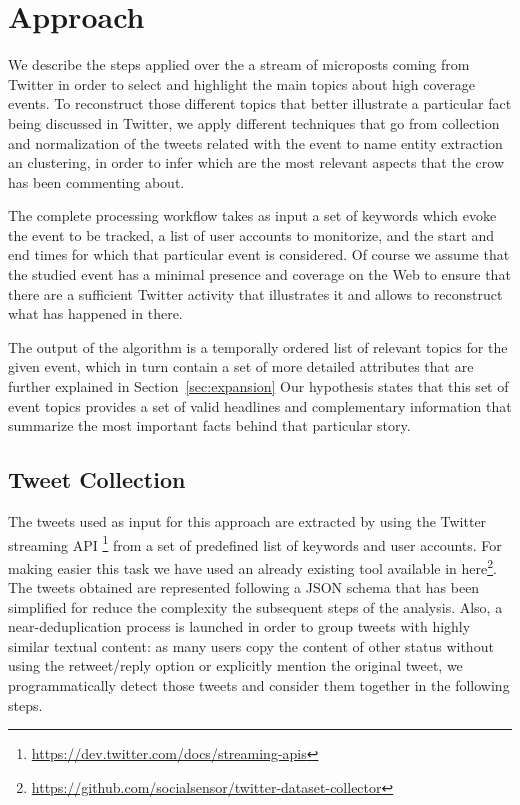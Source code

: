 \documentclass{sig-alternate}
\begin{document}

\section{Approach}

We describe the steps applied over the a stream of microposts coming from Twitter in order to select and highlight the main topics about high coverage events. To reconstruct those different topics that better illustrate a particular fact being discussed in Twitter, we apply different techniques that go from collection and normalization of the tweets related with the event to name entity extraction an clustering, in order to infer which are the most relevant aspects that the crow has been commenting about.

The complete processing workflow takes as input a set of keywords which evoke the event to be tracked, a list of user accounts to monitorize, and the start and end times for which that particular event is considered. Of course we assume that the studied event has a minimal presence and coverage on the Web to ensure that there are a sufficient Twitter activity that illustrates it and allows to reconstruct what has happened in there. 

The output of the algorithm is a temporally ordered list of relevant topics for the given event, which in turn contain a set of more detailed attributes that are further explained in Section~\ref{sec:expansion} Our hypothesis states that this set of event topics provides a set of valid headlines and complementary information that summarize the most important facts behind that particular story. 

\subsection{Tweet Collection}

The tweets used as input for this approach are extracted by using the Twitter streaming API \footnote{\fontsize{8pt}{1em}\selectfont \url{https://dev.twitter.com/docs/streaming-apis}} from a set of predefined list of keywords and user accounts. For making easier this task we have used an already existing tool available in here\footnote{\fontsize{8pt}{1em}\selectfont \url{https://github.com/socialsensor/twitter-dataset-collector}}. The tweets obtained are represented following a JSON schema that has been simplified for reduce the complexity the subsequent steps of the analysis. Also, a near-deduplication process is launched in order to group tweets with highly similar textual content: as many users copy the content of other status without using the retweet/reply option or explicitly mention the original tweet, we programmatically detect those tweets and consider them together in the following steps.
\end{document}
